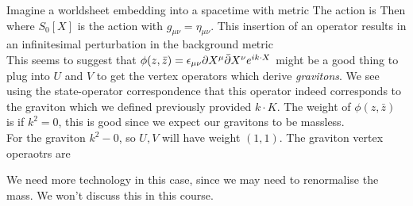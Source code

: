 \documentclass{article}
\begin{document}
\begin{example}
Imagine a worldsheet embedding into a spacetime with metric 
The action is 
Then 
where $S_0[X]$ is the action with $g_{\mu\nu} = \eta_{\mu\nu}$. This insertion of an operator 
results in an infinitesimal perturbation in the background metric \\
This seems to suggest that $\phi(z,\bar{z}) = \epsilon_{\mu\nu} \partial X^\mu \bar{\partial} X^\nu e^{ik \cdot X}$ might be a good thing to plug into $U$ and $V$ to get the vertex operators which derive \emph{gravitons}. We see using the state-operator correspondence that this operator indeed corresponds to the graviton which we defined previously provided $k \cdot K$. The weight of $\phi(z,\bar{z})$ is 
if $k^2=0$, this is good since we expect our gravitons to be massless. \\
For the graviton $k^2 - 0$, so $U,V$ will have weight $(1,1)$. The graviton vertex operaotrs are 
\end{example}

\begin{example}
We need more technology in this case, since we may need to renormalise the mass. We won't discuss this in this course. 
\end{example}

\end{document}

